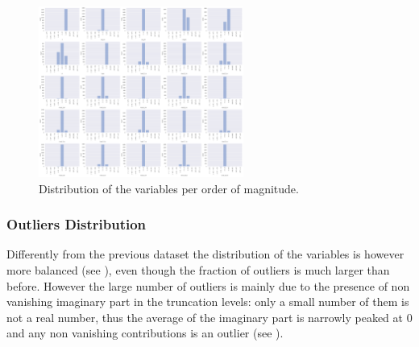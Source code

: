 \begin{figure}[htbp]
  \centering
  \includegraphics[width=0.6\textwidth]{img/var_counts}
  \caption{Distribution of the variables per order of magnitude.}
  \label{fig:wzw:counts}
\end{figure}


\subsubsection{Outliers Distribution}

Differently from the previous dataset the distribution of the variables is however more balanced (see ), even though the fraction of outliers is much larger than before.
However the large number of outliers is mainly due to the presence of non vanishing imaginary part in the truncation levels: only a small number of them is not a real number, thus the average of the imaginary part is narrowly peaked at 0 and any non vanishing contributions is an outlier (see ).

